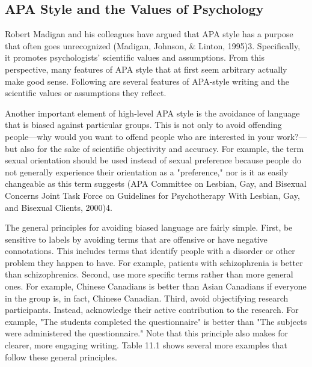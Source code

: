 \subsection{APA Style and the Values of Psychology}

Robert Madigan and his colleagues have argued that APA style has a purpose that often goes unrecognized (Madigan, Johnson, \& Linton, 1995)3. Specifically, it promotes psychologists' scientific values and assumptions. From this perspective, many features of APA style that at first seem arbitrary actually make good sense. Following are several features of APA-style writing and the scientific values or assumptions they reflect.

 




Another important element of high-level APA style is the avoidance of language that is biased against particular groups. This is not only to avoid offending people---why would you want to offend people who are interested in your work?---but also for the sake of scientific objectivity and accuracy. For example, the term sexual orientation should be used instead of sexual preference because people do not generally experience their orientation as a "preference," nor is it as easily changeable as this term suggests (APA Committee on Lesbian, Gay, and Bisexual Concerns Joint Task Force on Guidelines for Psychotherapy With Lesbian, Gay, and Bisexual Clients, 2000)4.


The general principles for avoiding biased language are fairly simple. First, be sensitive to labels by avoiding terms that are offensive or have negative connotations. This includes terms that identify people with a disorder or other problem they happen to have. For example, patients with schizophrenia is better than schizophrenics. Second, use more specific terms rather than more general ones. For example, Chinese Canadians is better than Asian Canadians if everyone in the group is, in fact, Chinese Canadian. Third, avoid objectifying research participants. Instead, acknowledge their active contribution to the research. For example, "The students completed the questionnaire" is better than "The subjects were administered the questionnaire." Note that this principle also makes for clearer, more engaging writing. Table 11.1 shows several more examples that follow these general principles.




